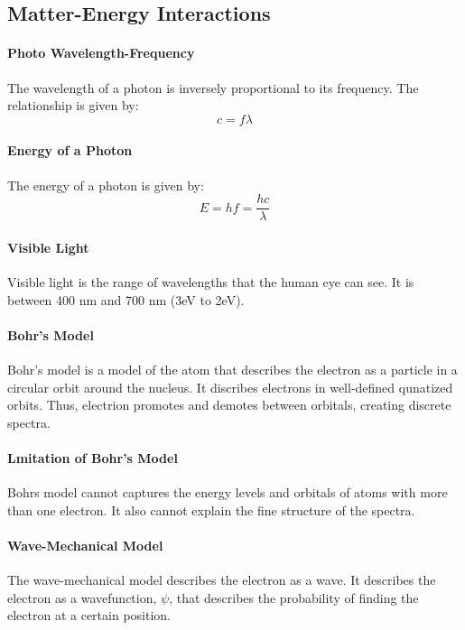 \documentclass[11pt]{report}
\begin{document}
\subsection{Matter-Energy Interactions}
\paragraph{Photo Wavelength-Frequency} The wavelength of a photon is inversely proportional to its frequency. The relationship is given by:
\begin{equation}
    c = f\lambda
\end{equation}
\paragraph{Energy of a Photon} The energy of a photon is given by:
\begin{equation}
    E = hf = \frac{hc}{\lambda}
\end{equation}
\paragraph{Visible Light} Visible light is the range of wavelengths that the human eye can see. It is between 400 nm and 700 nm (3eV to 2eV).
\paragraph{Bohr's Model} Bohr's model is a model of the atom that describes the electron as a particle in a circular orbit around the nucleus. It discribes electrons in well-defined qunatized orbits. Thus, electrion promotes and demotes between orbitals, creating discrete spectra.
\paragraph{Lmitation of Bohr's Model} Bohrs model cannot captures the energy levels and orbitals of atoms with more than one electron. It also cannot explain the fine structure of the spectra.
\paragraph{Wave-Mechanical Model} The wave-mechanical model describes the electron as a wave. It describes the electron as a wavefunction, $\psi$, that describes the probability of finding the electron at a certain position. 
\end{document}
